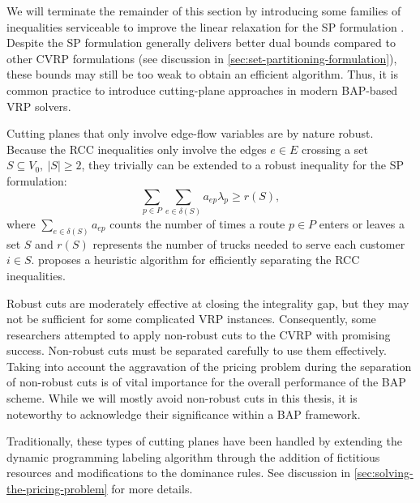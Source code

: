 \medskip

We will terminate the remainder of this section
by introducing some families of inequalities
serviceable to improve the linear relaxation for the SP formulation
.
Despite the SP formulation generally delivers better dual bounds
compared to other CVRP formulations (see discussion in \cref{sec:set-partitioning-formulation}),
these bounds may still be too weak to obtain an efficient algorithm.
Thus, it is common practice to introduce cutting-plane approaches
in modern BAP-based VRP solvers.

Cutting planes that only involve edge-flow variables are by nature robust.
Because the RCC inequalities only involve the edges
$e \in E$ crossing a set $S \subseteq V_0,\ |S| \ge 2$,
they trivially can be extended to a robust inequality for the SP formulation:
\begin{equation}
	\sum_{p \in P} \sum_{e \in \delta(S)}  a_{ep} \lambda_p \ge r(S),
\end{equation}
where $\sum_{e \in \delta(S)} a_{ep}$ counts the number of times a route $p \in P$
enters or leaves a set $S$
and $r(S)$ represents the number of trucks needed to serve each customer $i \in S$.
\textcite{lysgaard2003cvrpsep} proposes a heuristic algorithm
for efficiently separating the RCC inequalities.

\medskip

Robust cuts are moderately effective at closing the integrality gap,
but they may not be sufficient for some complicated VRP instances.
Consequently, some researchers attempted to apply non-robust cuts to the CVRP with promising success.
Non-robust cuts must be separated carefully to use them effectively.
Taking into account the aggravation of the pricing problem during the separation
of non-robust cuts is of vital importance for the overall performance of the BAP scheme.
While we will mostly avoid non-robust cuts in this thesis,
it is noteworthy to acknowledge their significance within a BAP framework.

Traditionally, these types of cutting planes have been handled by extending the
dynamic programming labeling algorithm
through the addition of fictitious resources and modifications to the dominance rules.
See discussion in \cref{sec:solving-the-pricing-problem} for more details.

\medskip

